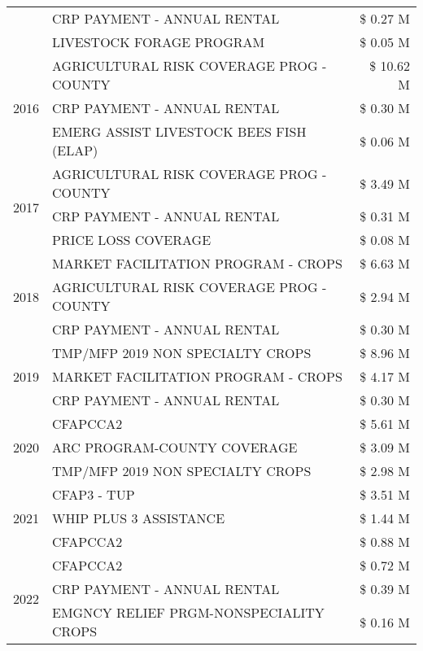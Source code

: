 \begin{tabular}{llr}
 & CRP PAYMENT - ANNUAL RENTAL & \$ 0.27 M \\
 & LIVESTOCK FORAGE PROGRAM & \$ 0.05 M \\
\cline{1-3}
\multirow[t]{3}{*}{2016} & AGRICULTURAL RISK COVERAGE PROG - COUNTY & \$ 10.62 M \\
 & CRP PAYMENT - ANNUAL RENTAL & \$ 0.30 M \\
 & EMERG ASSIST LIVESTOCK BEES FISH (ELAP) & \$ 0.06 M \\
\cline{1-3}
\multirow[t]{3}{*}{2017} & AGRICULTURAL RISK COVERAGE PROG - COUNTY & \$ 3.49 M \\
 & CRP PAYMENT - ANNUAL RENTAL & \$ 0.31 M \\
 & PRICE LOSS COVERAGE & \$ 0.08 M \\
\cline{1-3}
\multirow[t]{3}{*}{2018} & MARKET FACILITATION PROGRAM - CROPS & \$ 6.63 M \\
 & AGRICULTURAL RISK COVERAGE PROG - COUNTY & \$ 2.94 M \\
 & CRP PAYMENT - ANNUAL RENTAL & \$ 0.30 M \\
\cline{1-3}
\multirow[t]{3}{*}{2019} & TMP/MFP 2019 NON SPECIALTY CROPS & \$ 8.96 M \\
 & MARKET FACILITATION PROGRAM - CROPS & \$ 4.17 M \\
 & CRP PAYMENT - ANNUAL RENTAL & \$ 0.30 M \\
\cline{1-3}
\multirow[t]{3}{*}{2020} & CFAPCCA2 & \$ 5.61 M \\
 & ARC PROGRAM-COUNTY COVERAGE & \$ 3.09 M \\
 & TMP/MFP 2019 NON SPECIALTY CROPS & \$ 2.98 M \\
\cline{1-3}
\multirow[t]{3}{*}{2021} & CFAP3 - TUP & \$ 3.51 M \\
 & WHIP PLUS 3 ASSISTANCE & \$ 1.44 M \\
 & CFAPCCA2 & \$ 0.88 M \\
\cline{1-3}
\multirow[t]{3}{*}{2022} & CFAPCCA2 & \$ 0.72 M \\
 & CRP PAYMENT - ANNUAL RENTAL & \$ 0.39 M \\
 & EMGNCY RELIEF PRGM-NONSPECIALITY CROPS & \$ 0.16 M \\
\cline{1-3}
\bottomrule
\end{tabular}
